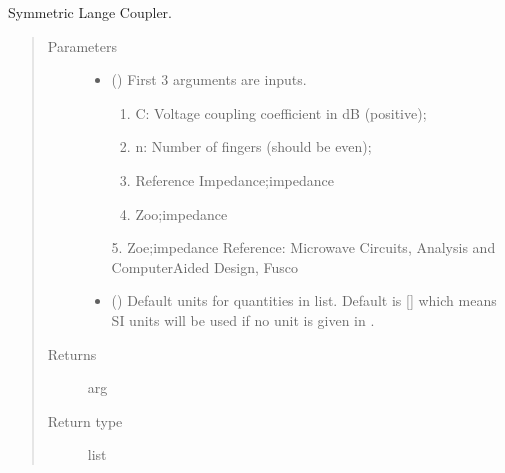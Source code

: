 \documentclass[letterpaper,10pt,english]{sphinxmanual}
\begin{document}

\begin{fulllineitems}
\label{\detokenize{components:components.SymmetricLangeCoupler}}
Symmetric Lange Coupler.
\begin{quote}\begin{description}
\item[{Parameters}] \leavevmode\begin{itemize}
\item {} 
 () \textendash{} 
First 3 arguments are inputs.
\begin{enumerate}
%
\item {} 
C: Voltage coupling coefficient in dB (positive);

\item {} 
n: Number of fingers (should be even);

\item {} 
Reference Impedance;impedance

\item {} 
Zoo;impedance

\end{enumerate}

5. Zoe;impedance
Reference:  Microwave Circuits, Analysis and Computer\sphinxhyphen{}Aided Design, Fusco


\item {} 
 (\sphinxstyleliteralemphasis{\sphinxupquote{, }}) \textendash{} Default units for quantities in  list. Default is {[}{]} which means SI units will be used if no unit is given in .

\end{itemize}

\item[{Returns}] \leavevmode
arg

\item[{Return type}] \leavevmode
list

\end{description}\end{quote}

\end{fulllineitems}
\end{document}
